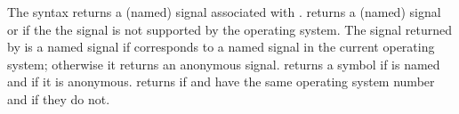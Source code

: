 \begin{protos}
\end{protos}
\noindent
The syntax  returns a (named) signal associated with
.
 returns a (named) signal or  if the
 the signal  is not supported by the operating system.
The signal returned by  is a named signal if
  corresponds to a named signal in the current operating
 system; otherwise it returns an anonymous signal.
 returns a symbol if  is named and
  if it is anonymous. 
 returns  if  and 
 have the same operating system number and  if they do not.

